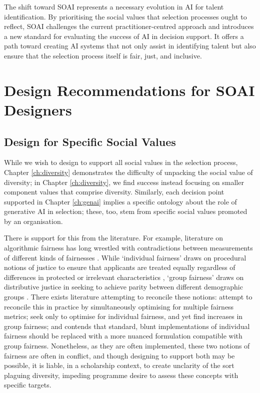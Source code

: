 The shift toward SOAI represents a necessary evolution in AI for talent identification. By prioritising the social values that selection processes ought to reflect, SOAI challenges the current practitioner-centred approach and introduces a new standard for evaluating the success of AI in decision support. It offers a path toward creating AI systems that not only assist in identifying talent but also ensure that the selection process itself is fair, just, and inclusive.

\section{Design Recommendations for SOAI Designers}
\subsection{Design for Specific Social Values}
While we wish to design to support all social values in the selection process, Chapter \ref{ch:diversity} demonstrates the difficulty of unpacking the social value of diversity; in Chapter \ref{ch:diversity}, we find success instead focusing on smaller component values that comprise diversity. Similarly, each decision point supported in Chapter \ref{ch:genai} implies a specific ontology about the role of generative AI in selection; these, too, stem from specific social values promoted by an organisation.

There is support for this from the literature. For example, literature on algorithmic fairness has long wrestled with contradictions between measurements of different kinds of fairnesses \cite{pmlr-v80-kearns18a}. While `individual fairness' draws on procedural notions of justice to ensure that applicants are treated equally regardless of differences in protected or irrelevant characteristics \cite{dwork_fairness_2012}, `group fairness' draws on distributive justice in seeking to achieve parity between different demographic groups \cite{Citron_2008,Olsaretti_2018}. There exists literature attempting to reconcile these notions: \textcite{pmlr-v28-zemel13} attempt to reconcile this in practice by simultaneously optimising for multiple fairness metrics; \textcite{lahoti2019ifairlearningindividuallyfair} seek only to optimise for individual fairness, and yet find increases in group fairness; and \textcite{binns_apparent_2019} contends that standard, blunt implementations of individual fairness should be replaced with a more nuanced formulation compatible with group fairness. Nonetheless, as they are often implemented, these two notions of fairness are often in conflict, and though designing to support both may be possible, it is liable, in a scholarship context, to create unclarity of the sort plaguing diversity, impeding programme desire to assess these concepts with specific targets. 

